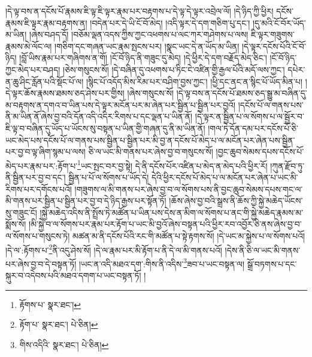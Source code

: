།དེ་ལྟ་བས་ན་དངོས་པོ་རྣམས་ཇི་ལྟ་ཇི་ལྟར་རྣམ་པར་བརྟགས་པ་དེ་ལྟ་དེ་ལྟར་འབྲེལ་ལོ། །དེ་ཉིད་ཀྱི་ཕྱིར། དངོས་རྣམས་ཇི་ལྟར་རྣམ་བརྟགས་ན། །བདེན་པར་དེ་ཡི་ངོ་བོ་མེད། །འདི་ལྟར་དེ་དག་གཅིག་པུ་དང་། །དུ་མའི་ངོ་བོར་ཡོད་མ་ཡིན། །ཞེས་བཤད་དོ། །བཅོམ་ལྡན་འདས་ཀྱིས་ཀྱང་འཕགས་པ་ལང་ཀར་གཤེགས་པ་ལས། ཇི་ལྟར་གཟུགས་རྣམས་མེ་ལོང་ལ། །གཅིག་དང་གཞན་ཡང་རྣམ་སྤངས་པར། །སྣང་ཡང་དེ་ན་ཡོད་མ་ཡིན། །དེ་ལྟར་དངོས་པོའི་ངོ་བོ་ཉིད། །བློ་ཡིས་རྣམ་པར་གཞིགས་ན་གོ། །ངོ་བོ་ཉིད་ནི་གཟུང་དུ་མེད། །དེ་ཕྱིར་དེ་དག་བརྗོད་མེད་ཅིང་། །ངོ་བོ་ཉིད་ཀྱང་མེད་པར་བཤད། །ཅེས་གསུངས་སོ། །དེ་བཞིན་དུ་འཕགས་པ་ཏིང་ངེ་འཛིན་གྱི་རྒྱལ་པོའི་མདོ་ལས་ཀྱང་། དཔེར་ན་ཆུ་ཤིང་རློན་པའི་སྡོང་པོ་ལ། །སྙིང་པོ་འདོད་མིས་རིམ་པར་བཤིག་བྱས་ཀྱང་། །ཕྱི་དང་ནང་ན་སྙིང་པོ་ཡོད་མིན་པ། །དེ་ལྟར་ཆོས་རྣམས་ཐམས་ཅད་ཤེས་པར་གྱིས། །ཞེས་གསུངས་སོ། །དེ་ལྟ་བས་ན་དངོས་པོ་ཐམས་ཅད་སྒྱུ་མ་བཞིན་དུ་མ་བརྟགས་ན་དགའ་བ་ཡིན་པས་དེ་ལྟར་མངོན་པར་མ་ཞེན་པར་སྦྱིན་པ་སྦྱིན་པར་བྱའོ། །དངོས་པོ་ལ་གནས་པས་ནི་མ་ཡིན་ནོ་ཞེས་བྱ་བའི་དོན་འདི་འདིར་རིགས་པ་དང་ལྡན་པ་ཡིན་ནོ། །དེ་ལྟར་ན་སྦྱིན་པ་ལ་སོགས་པ་ལ་སྦྱོར་བ་ཇི་ལྟ་བ་བཞིན་དུ་ཡོད་པ་ཡོངས་སུ་བསྟན་པ་ཡིན་གྱི་གཞན་དུ་ནི་མ་ཡིན་ནོ། །གལ་ཏེ་དོན་དམ་པར་དངོས་པོ་ཅི་ཡང་མེད་པས་དངོས་པོ་ལ་གནས་པས་སྦྱིན་པ་སྦྱིན་པར་མི་བྱ་ན་དངོས་པོ་མེད་པ་ལ་མངོན་པར་ཞེན་པས་སྦྱིན་པར་བྱ་བ་ལྟ་ཞིག་སྙམ་པ་ལས། ཅི་ལ་ཡང་མི་གནས་པར་ཞེས་བྱ་བ་གསུངས་སོ། །བྱང་ཆུབ་སེམས་དཔས་དངོས་པོ་མེད་པར་རྣམ་པར་:རྟོག་པ་\footnote{རྟོགས་པ་  སྣར་ཐང་། }ཡང་སྤང་བར་བྱ་སྟེ། དེ་ནི་དངོས་པོར་འཛིན་པ་མེད་ན་མེད་པའི་ཕྱིར་རོ། །ཀུན་རྫོབ་ཏུ་ནི་སྦྱིན་པར་བྱ་བ་དང་། སྦྱིན་པ་པོ་ལ་སོགས་པ་ཡོད་དེ། དེའི་ཕྱིར་དངོས་པོ་མེད་པ་ལ་མངོན་པར་ཞེན་པ་ཡང་མི་རིགས་པར་དགོངས་པའོ། །གཟུགས་ལ་མི་གནས་པར་ཞེས་བྱ་བ་ལ་སོགས་པས་ནི་བྱང་ཆུབ་སེམས་དཔས་གང་ལ་མི་གནས་པར་སྦྱིན་པ་སྦྱིན་པར་བྱ་བ་དེ་ཉིད་རྒྱས་པར་སྟོན་ཏོ། །ཆོས་ཞེས་བྱ་བའི་སྒྲས་ནི་ཆོས་ཀྱི་སྐྱེ་མཆེད་ཡོངས་སུ་གཟུང་ངོ། །སྐྱེ་མཆེད་འདིས་ནི་སྤྲོས་ཏེ་མཚོན་པ་ཡིན་པས་དེས་ན་མིག་ལ་སོགས་པ་ནང་གི་སྐྱེ་མཆེད་རྣམས་མ་སྨོས་སོ། །མི་སྐྱེ་བ་ལ་སོགས་པར་རྣམ་པར་རྟོག་པ་ཡང་མི་བྱའོ་ཞེས་བསྟན་པའི་ཕྱིར་རབ་འབྱོར་ཅི་ནས་ཞེས་བྱ་བ་ལ་སོགས་པ་གསུངས་ཏེ། མཚན་མ་ནི་དངོས་པོའི་རང་གི་མཚོན་པ་སྟེ་རྟགས་སོ། །དེ་ཡང་མ་སྐྱེས་པ་ལ་སོགས་པའོ། །དེ་ལ་:རྟོགས་པ་\footnote{རྟོག་པ་  སྣར་ཐང་།  པེ་ཅིན། }ནི་འདུ་ཤེས་སོ། །དེ་ལ་རྣམ་པར་མི་རྟོག་པ་ནི་དེ་ལ་མི་གནས་པའོ། །དེས་ནི་ཅི་ལ་ཡང་མི་གནས་པར་ཞེས་བྱ་བ་དེ་བསྟན་ཏོ། །ཡང་ན་འདི་མཐའ་དག་:གིས་ནི་འདིས་\footnote{གིས་འདིའི་  སྣར་ཐང་།  པེ་ཅིན། }ཟབ་པ་ཡང་བསྟན་ལ། སྒྲོ་བཏགས་པ་དང་སྐུར་བ་འདེབས་པའི་མཐའ་དགག་པ་ཡང་བསྟན་ཏོ། །
